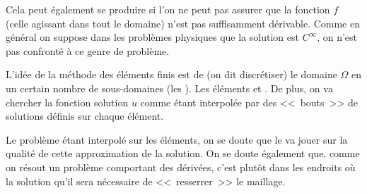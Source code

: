 Cela peut également se produire si l'on ne peut pas assurer que la fonction $f$
(celle agissant dans tout le domaine) n'est pas suffisamment dérivable.
Comme en général on suppose dans les problèmes physiques que la solution est $C^\infty$,
on n'est pas confronté à ce genre de problème.

\medskip
L'idée de la méthode des éléments finis est de  (on dit discrétiser) le domaine $\Omega$
en un certain nombre de sous-domaines (les ).
Les éléments 
et 
.
De plus, on va chercher la fonction solution $u$ comme étant interpolée par des <<~bouts~>>
de solutions définis sur chaque élément.

\medskip
Le problème étant interpolé sur les éléments, on se doute que le
 va jouer sur la qualité de cette approximation de la solution.
On se doute également que, comme on résout un problème comportant des
dérivées, c'est plutôt dans les endroits où la solution  qu'il
sera nécessaire de <<~resserrer~>> le maillage.

